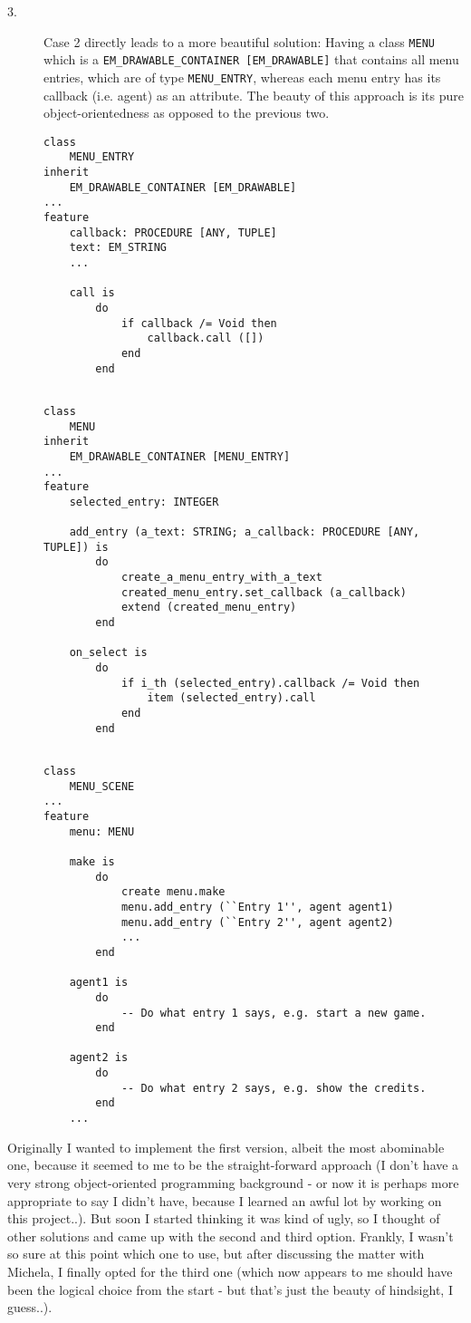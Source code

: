 \begin{description}
  \item[3.] Case 2 directly leads to a more beautiful solution: Having a class \texttt{MENU} which is a \texttt{EM\_DRAWABLE\_CONTAINER [EM\_DRAWABLE]} that contains all menu entries, which are of type \texttt{MENU\_ENTRY}, whereas each menu entry has its callback (i.e. agent) as an attribute. The beauty of this approach is its pure object-orientedness as opposed to the previous two.
    \begin{lstlisting}
class
	MENU_ENTRY
inherit
	EM_DRAWABLE_CONTAINER [EM_DRAWABLE]
...
feature
	callback: PROCEDURE [ANY, TUPLE]
	text: EM_STRING
	...
	
	call is
		do
			if callback /= Void then
				callback.call ([])
			end
		end
	
    \end{lstlisting}    
    \begin{lstlisting}
class
	MENU
inherit
	EM_DRAWABLE_CONTAINER [MENU_ENTRY]
...
feature
	selected_entry: INTEGER
	
	add_entry (a_text: STRING; a_callback: PROCEDURE [ANY, TUPLE]) is
		do
			create_a_menu_entry_with_a_text
			created_menu_entry.set_callback (a_callback)
			extend (created_menu_entry)
		end
	
	on_select is
		do
			if i_th (selected_entry).callback /= Void then
				item (selected_entry).call
			end
		end
      
    \end{lstlisting}
    \begin{lstlisting}
class
	MENU_SCENE
...
feature
	menu: MENU
	
	make is
		do
			create menu.make
			menu.add_entry (``Entry 1'', agent agent1)
			menu.add_entry (``Entry 2'', agent agent2)
			...
		end

	agent1 is
		do
			-- Do what entry 1 says, e.g. start a new game.
		end
	
	agent2 is
		do
			-- Do what entry 2 says, e.g. show the credits.
		end
	...		
    \end{lstlisting}
\end{description}

Originally I wanted to implement the first version, albeit the most abominable one, because it seemed to me to be the straight-forward approach (I don't have a very strong object-oriented programming background - or now it is perhaps more appropriate to say I didn't have, because I learned an awful lot by working on this project..). But soon I started thinking it was kind of ugly, so I thought of other solutions and came up with the second and third option. Frankly, I wasn't so sure at this point which one to use, but after discussing the matter with Michela, I finally opted for the third one (which now appears to me should have been the logical choice from the start - but that's just the beauty of hindsight, I guess..).

